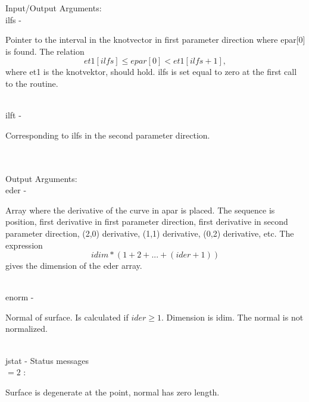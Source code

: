 \newpagetabs
        \>Input/Output Arguments:\\
        \>\>    {\fov ilfs}\> - \>  \begin{minipg2}
                     Pointer to the interval in the knotvector
                        in first parameter direction where {\fov epar}[0]
                        is found. The relation
                        \[
                          et1[ilfs]\leq epar[0] < et1[ilfs+1],
                        \]
                        where {\fov et1} is the knotvektor, should hold.
                        {\fov ilfs} is set equal to zero at the first call
                        to the routine.
                               \end{minipg2}\\[0.8ex]
        \>\>    {\fov ilft}\> - \>  \begin{minipg2}
                     Corresponding to {\fov ilfs} in the second parameter
                        direction.
                               \end{minipg2}\\[0.8ex]
\\
        \>Output Arguments:\\
        \>\>    {\fov eder}\> - \>  \begin{minipg2}
                     Array where the derivative of the curve in
                       {\fov apar} is placed. The sequence is position,
                       first derivative in first parameter direction,
                       first derivative in second parameter direction,
                       (2,0) derivative, (1,1) derivative, (0,2)
                       derivative, etc. The expression
                       \[
                       idim*(1+2+...+(ider+1))
                       \]
                       gives the dimension of the {\fov eder} array.
                               \end{minipg2}\\[0.8ex]
        \>\>    {\fov enorm}\> - \>  \begin{minipg2}
                     Normal of surface. Is calculated if $ider\geq 1$.
                       Dimension is {\fov idim}. The normal is not normalized.
                               \end{minipg2}\\[0.8ex]
        \>\>    {\fov jstat}     \> - \> Status messages\\
                \>\>\>\>\>      $= 2$ : \>
                                \begin{minipg5}
                                  Surface is degenerate at the point,
                                  normal has zero length.
                                \end{minipg5}\\[0.8ex]

